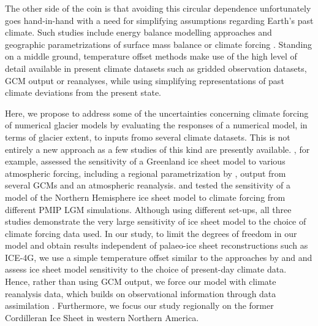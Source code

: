 The other side of the coin is that avoiding this circular dependence unfortunately goes hand-in-hand with a need for simplifying assumptions regarding Earth's past climate. Such studies include energy balance modelling approaches \citep{tarasov-peltier-1997} and geographic parametrizations of surface mass balance \citep{robert-1991} or climate forcing \citep{johnson-fastook-2002}. Standing on a middle ground, temperature offset methods \citep{greve-etal-1999,bintanja-etal-2005} make use of the high level of detail available in present climate datasets such as gridded observation datasets, GCM output or reanalyses, while using simplifying representations of past climate deviations from the present state.

Here, we propose to address some of the uncertainties concerning climate forcing of numerical glacier models by evaluating the responses of a numerical model, in terms of glacier extent, to inputs fromo several climate datasets. This is not entirely a new approach as a few studies of this kind are presently available. \citet{quiquet-etal-2012}, for example, assessed the sensitivity of a Greenland ice sheet model to various atmospheric forcing, including a regional parametrization by \citet{fausto-etal-2009}, output from several GCMs and an atmospheric reanalysis. \citet{rodgers-etal-2004} and \citet{charbit-etal-2007} tested the sensitivity of a model of the Northern Hemisphere ice sheet model to climate forcing from different PMIP LGM simulations. Although using different set-ups, all three studies demonstrate the very large sensitivity of ice sheet model to the choice of climate forcing data used. In our study, to limit the degrees of freedom in our model and obtain results independent of palaeo-ice sheet reconstructions such as ICE-4G, we use a simple temperature offset similar to the approaches by \citet{greve-etal-1999} and \citet{bintanja-etal-2005} and assess ice sheet model sensitivity to the choice of present-day climate data. Hence, rather than using GCM output, we force our model with climate reanalysis data, which builds on observational information through data assimilation \citep{bengtsson-etal-2007}. Furthermore, we focus our study regionally on the former Cordilleran Ice Sheet in western Northern America.

